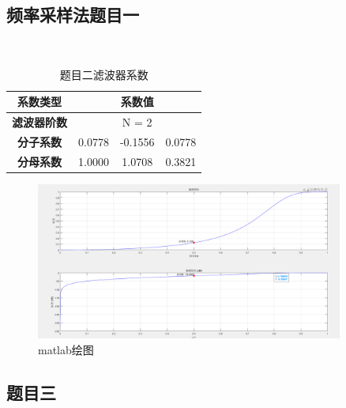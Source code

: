 \documentclass[12pt,hyperref,a4paper,UTF8]{ctexart}
\begin{document}
\subsection{频率采样法题目一}


\begin{lstlisting}[style=matlab, caption={ MATLAB实现代码}]


\end{lstlisting}

\begin{table}[H]
\centering
\caption{题目二滤波器系数}
\label{tab:filter_coef2}
\begin{tabular}{|c|c|c|c|}
\hline
\textbf{系数类型} & \multicolumn{3}{c|}{\textbf{系数值}} \\
\hline
\textbf{滤波器阶数} & \multicolumn{3}{c|}{N = 2} \\
\hline
\textbf{分子系数} & 0.0778 & -0.1556 & 0.0778 \\
\hline
\textbf{分母系数} & 1.0000 & 1.0708 & 0.3821 \\
\hline
\end{tabular}
\end{table}

\begin{figure}[H] %
        \centering
        \includegraphics[width=0.9\textwidth]{figures/302.png} %
        \caption{matlab绘图} %
        \label{fig:example} %
\end{figure}

\subsection{题目三}


\begin{lstlisting}[style=matlab, caption={ MATLAB实现代码}]


\end{lstlisting}
\end{document}
